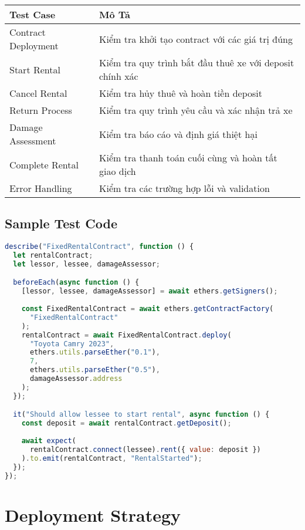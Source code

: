 \documentclass[12pt,a4paper]{article}
\begin{document}
\begin{longtable}{|p{4cm}|p{10cm}|}
\hline
\textbf{Test Case} & \textbf{Mô Tả} \\
\hline
Contract Deployment & Kiểm tra khởi tạo contract với các giá trị đúng \\
\hline
Start Rental & Kiểm tra quy trình bắt đầu thuê xe với deposit chính xác \\
\hline
Cancel Rental & Kiểm tra hủy thuê và hoàn tiền deposit \\
\hline
Return Process & Kiểm tra quy trình yêu cầu và xác nhận trả xe \\
\hline
Damage Assessment & Kiểm tra báo cáo và định giá thiệt hại \\
\hline
Complete Rental & Kiểm tra thanh toán cuối cùng và hoàn tất giao dịch \\
\hline
Error Handling & Kiểm tra các trường hợp lỗi và validation \\
\hline
\end{longtable}

\subsection{Sample Test Code}
\begin{lstlisting}[language=JavaScript, caption=Ví dụ test case]
describe("FixedRentalContract", function () {
  let rentalContract;
  let lessor, lessee, damageAssessor;

  beforeEach(async function () {
    [lessor, lessee, damageAssessor] = await ethers.getSigners();
    
    const FixedRentalContract = await ethers.getContractFactory(
      "FixedRentalContract"
    );
    rentalContract = await FixedRentalContract.deploy(
      "Toyota Camry 2023",
      ethers.utils.parseEther("0.1"),
      7,
      ethers.utils.parseEther("0.5"),
      damageAssessor.address
    );
  });

  it("Should allow lessee to start rental", async function () {
    const deposit = await rentalContract.getDeposit();
    
    await expect(
      rentalContract.connect(lessee).rent({ value: deposit })
    ).to.emit(rentalContract, "RentalStarted");
  });
});
\end{lstlisting}

\section{Deployment Strategy}
\end{document}
